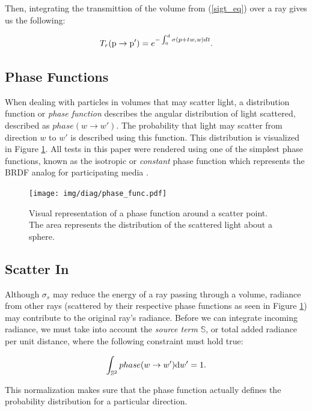 \documentclass[12pt]{ucthesis}
\newcommand{\captionfonts}{\small\bf\ssp}
\begin{document}
Then, integrating the transmittion of the volume from (\ref{sigt_eq}) over a ray gives us the following:

\begin{equation}
T_{r}(\textup{p} \to \textup{p}') = e^{-\int_{0}^{d}\sigma (p+t\mathit{w},\mathit{w})d\mathit{t}}.
\label{transmittion_eq}
\end{equation}

\subsection{Phase Functions}
When dealing with particles in volumes that may scatter light, a distribution function or \textit{phase function} describes the angular distribution of light scattered, described as $phase(w \to w')$.  The probability that light may scatter from direction $w$ to $w'$ is described using this function.  This distribution is visualized in Figure \ref{fig:phase}. All tests in this paper were rendered using one of the simplest phase functions, known as the isotropic or \textit{constant} phase function which represents the BRDF analog for participating media \cite{cerezo}.

\begin{figure}[h!]
    \centering
    \texttt{[image: img/diag/phase\_func.pdf]}
    \captionfonts
    \caption{Visual representation of a phase function around a scatter point.  The area represents the distribution of the scattered light about a sphere.}
    \label{fig:phase}
\end{figure}

\subsection{Scatter In}
Although $\sigma_{s}$ may reduce the energy of a ray passing through a volume, radiance from other rays (scattered by their respective phase functions as seen in Figure \ref{fig:phase}) may contribute to the original ray's radiance.  Before we can integrate incoming radiance, we must take into account the \textit{source term} $\mathbb{S}$, or total added radiance per unit distance, where the following constraint must hold true:

\begin{equation}
\int_{\mathbb{S}^2}phase(w \to w')\textup{d}w' = 1.
\label{source_eq}
\end{equation}

This normalization makes sure that the phase function actually defines the probability distribution for a particular direction.
\end{document}
